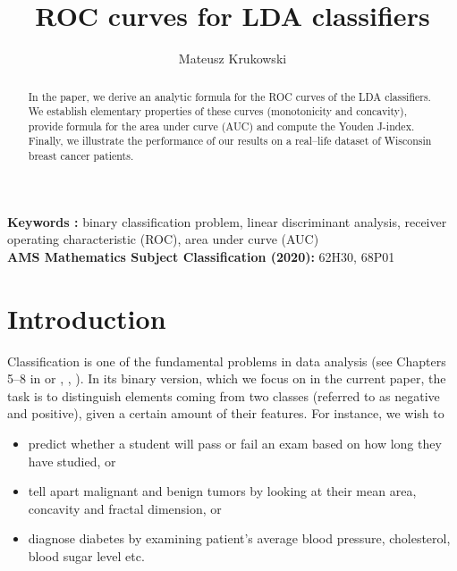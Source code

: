 \documentclass[10pt]{article}
\begin{document}
\title{ROC curves for LDA classifiers}
\author{Mateusz Krukowski}
\maketitle


\begin{abstract}
In the paper, we derive an analytic formula for the ROC curves of the LDA classifiers. We establish elementary properties of these curves (monotonicity and concavity), provide formula for the area under curve (AUC) and compute the Youden J-index. Finally, we illustrate the performance of our results on a real--life dataset of Wisconsin breast cancer patients. 
\end{abstract}


\smallskip
\noindent 
\textbf{Keywords : } binary classification problem, linear discriminant analysis, receiver operating characteristic (ROC), area under curve (AUC)
\vspace{0.2cm}
\\
\textbf{AMS Mathematics Subject Classification (2020): } 62H30, 68P01

\section{Introduction}
\label{section:Introduction}

Classification is one of the fundamental problems in data analysis (see Chapters 5--8 in \cite{Bonaccorso} or \cite{Flach}, \cite{Herbrich}, \cite{MichieSpiegelhalterTaylor}). In its binary version, which we focus on in the current paper, the task is to distinguish elements coming from two classes (referred to as negative and positive), given a certain amount of their features. For instance, we wish to 
\begin{itemize}
	\item predict whether a student will pass or fail an exam based on how long they have studied, or   
	\item tell apart malignant and benign tumors by looking at their mean area, concavity and fractal dimension, or
	\item diagnose diabetes by examining patient's average blood pressure, cholesterol, blood sugar level etc.
\end{itemize}
\end{document}
